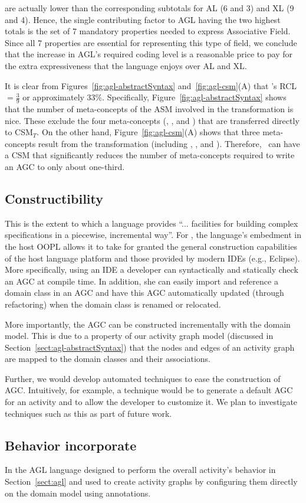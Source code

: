 are actually lower than the corresponding subtotals for AL (6 and 3) and XL (9 and 4). Hence, the single contributing factor to AGL having the two highest totals is the set of 7 mandatory properties needed to express Associative Field. Since all 7 properties are essential for representing this type of field, we conclude that the increase in AGL’s required coding level is a reasonable price to pay for the extra expressiveness that the language enjoys over AL and XL.

It is clear from Figures~\ref{fig:agl-abstractSyntax} and~\ref{fig:agl-csm}(A) that \agl's RCL $ = \frac{3}{9}$ or approximately 33\%. Specifically, Figure~\ref{fig:agl-abstractSyntax} shows that the number of meta-concepts of the ASM involved in the transformation is nice. These exclude the four meta-concepts (, ,  and ) that are transferred directly to CSM$_T$. On the other hand, Figure~\ref{fig:agl-csm}(A) shows that three meta-concepts result from the transformation (including , , and ). Therefore, \agl~can have a CSM that significantly reduces the number of meta-concepts required to write an AGC to only about one-third. 
%
\subsection{Constructibility} \label{sect:eval-construct}
This is the extent to which a language provides ``... facilities for building complex specifications in a piecewise, incremental way''\cite{lamsweerde_formal_2000}. For \agl, the language's embedment in the host OOPL allows it to take for granted the general construction capabilities of the host language platform and those provided by modern IDEs (e.g., Eclipse). More specifically, using an IDE a developer can syntactically and statically check an AGC at compile time. In addition, she can easily import and reference a domain class in an AGC and have this AGC automatically updated (through refactoring) when the domain class is renamed or relocated.

More importantly, the AGC can be constructed incrementally with the domain model. This is due to a property of our activity graph model (discussed in Section~\ref{sect:agl-abstractSyntax}) that the nodes and edges of an activity graph are mapped to the domain classes and their associations.

Further, we would develop automated techniques to ease the construction of AGC. Intuitively, for example, a technique would be to generate a default AGC for an activity and to allow the developer to customize it. We plan to investigate techniques such as this as part of future work.
%
\subsection{Behavior incorporate} \label{sect:eval-behavior-incorporate}
In the AGL language designed to perform the overall activity’s behavior in Section~\ref{sect:agl} and used to create activity graphs by configuring them directly on the domain model using annotations.
